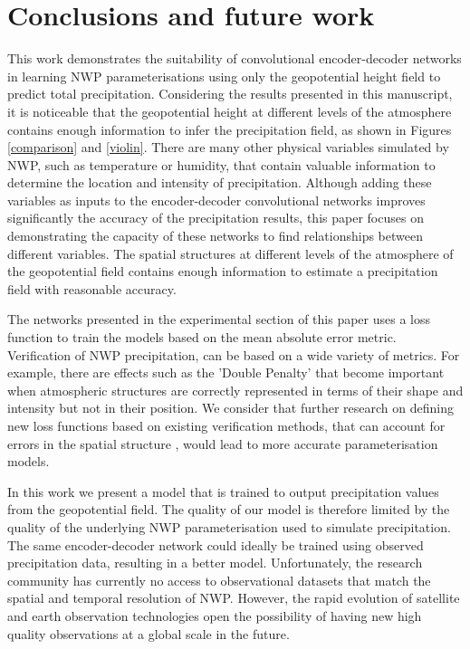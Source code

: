 \documentclass[twocol]{ametsoc}
\begin{document}
\section{Conclusions and future work}

This work demonstrates the suitability of convolutional encoder-decoder networks in learning NWP parameterisations using only the geopotential height field to predict total precipitation. Considering the results presented in this manuscript, it is noticeable that the geopotential height at different levels of the atmosphere contains enough information to infer the precipitation field, as shown in Figures \ref{comparison} and \ref{violin}. There are many other physical variables simulated by NWP, such as temperature or humidity, that contain valuable information to determine the location and intensity of precipitation. Although adding these variables as inputs to the encoder-decoder convolutional networks improves significantly the accuracy of the precipitation results, this paper focuses on demonstrating the capacity of these networks to find relationships between different variables. The spatial structures at different levels of the atmosphere of the geopotential field contains enough information to estimate a precipitation field with reasonable accuracy.

The networks presented in the experimental section of this paper uses a loss function to train the models based on the mean absolute error metric. Verification of NWP precipitation, can be based on a wide variety of metrics. For example, there are effects such as the 'Double Penalty' \citep{mass2002does,bougeault2003wgne} that become important when atmospheric structures are correctly represented in terms of their shape and intensity but not in their position. We consider that further research on defining new loss functions based on existing verification methods, that can account for errors in the spatial structure \citep{rossa2008overview}, would lead to more accurate parameterisation models.

In this work we present a model that is trained to output precipitation values from the geopotential field. The quality of our model is therefore limited by the quality of the underlying NWP parameterisation used to simulate precipitation. The same encoder-decoder network could ideally be trained using observed precipitation data, resulting in a better model. Unfortunately, the research community has currently no access to observational datasets that match the spatial and temporal resolution of NWP. However, the rapid evolution of satellite and earth observation technologies open the possibility of having new high quality observations at a global scale in the future.
\end{document}
